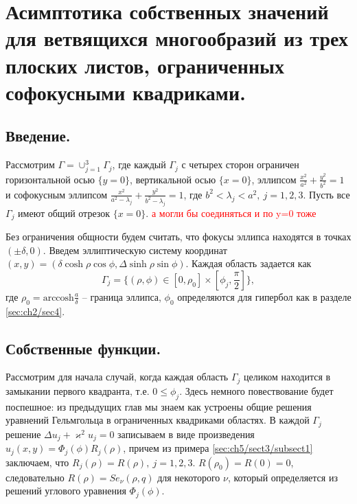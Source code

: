 \chapter{Асимптотика собственных значений для ветвящихся многообразий из трех плоских листов, ограниченных софокусными квадриками.}\label{ch:ch6}

\section{Введение.}\label{sec:ch6/sect1}
Рассмотрим  $\Gamma = \cup_{j=1}^3 \Gamma_j$, где каждый $\Gamma_j$ с четырех сторон ограничен горизонтальной осью $\{y=0\}$, вертикальной осью $\{x=0\}$, эллипсом $\frac{x^2}{a^2} + \frac{y^2}{b^2} =1$ и софокусным эллипсом $\frac{x^2}{a^2 - \lambda_j} + \frac{y^2}{b^2-\lambda_j} =1$, где $b^2 < \lambda_j < a^2, \ j=1,2,3$. Пусть все $\Gamma_j$ имеют общий отрезок $\{x=0\}$.
\textcolor{red}{а могли бы соединяться и по y=0 тоже}

Без ограничения общности будем считать, что фокусы эллипса находятся в точках $(\pm \delta, 0)$. Введем эллиптическую систему координат $(x,y) = (\delta \cosh \rho \cos \phi, \Delta \sinh \rho \sin \phi)$. Каждая область задается как  
$$\Gamma_j = \{(\rho, \phi) \in [0, \rho_0] \times [\phi_j, \frac{\pi}{2}]\},$$
где $\rho_0  = \text{arccosh} \frac{a}{\delta}$ -- граница эллипса, $\phi_0$ определяются для гипербол как в разделе \ref{sec:ch2/sec4}.


\section{Собственные функции.}\label{sec:ch6/sect2}
Рассмотрим для начала случай, когда каждая область $\Gamma_j$ целиком находится в замыкании первого квадранта, т.е. $0 \leq \phi_j$. 
Здесь немного повествование будет поспешное: из предыдущих глав мы знаем как устроены общие решения уравнений Гельмгольца в ограниченных квадриками областях. В каждой $\Gamma_j$ решение $\Delta u_j +\varkappa^2 u_j = 0$ записываем в виде произведения $u_j(x,y) = \Phi_j(\phi)R_j(\rho)$, причем из примера \ref{sec:ch5/sect3/subsect1} заключаем, что $R_j(\rho) = R(\rho), \ j=1,2,3$.  
$R(\rho_0)=R(0)=0$, следовательно $R(\rho) = Se_\nu(\rho, q)$ для некоторого $\nu$, который определяется из решений углового уравнения $\Phi_j(\phi)$. 

